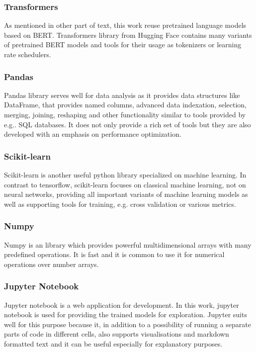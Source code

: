 \subsubsection{Transformers} 
As mentioned in other part of text, this work reuse pretrained language models based on BERT. Transformers library from Hugging Face\citep{Wolf2019HuggingFacesTS} contains many variants of pretrained BERT models and tools for their usage as tokenizers or learning rate schedulers.
\subsubsection{Pandas}
Pandas library \citep{reback2020pandas} serves well for data analysis as it provides data structures like DataFrame, that provides named columns, advanced data indexation, selection, merging, joining, reshaping and other functionality similar to tools provided by e.g.. SQL databases. It does not only provide a rich set of tools but they are also developed with an emphasis on performance optimization.
\subsubsection{Scikit-learn}
Scikit-learn \citep{scikit-learn}  is another useful python library specialized on machine learning. In contrast to tensorflow, scikit-learn focuses on classical machine learning, not on neural networks, providing all important variants of machine learning models as well as supporting tools for training, e.g. cross validation or various metrics.
\subsubsection{Numpy}
Numpy \citep{harris2020array} is an library which provides powerful multidimensional arrays with many predefined operations. It is fast and it is common to use it for numerical operations over number arrays.
\subsubsection{Jupyter Notebook}
Jupyter notebook \citep{jupyter} is a web application for development. In this work, jupyter notebook is used for providing the trained models for exploration. %
Jupyter suits well for this purpose because it, in addition to a possibility of running a separate parts of code in different cells, also supports visualisations and markdown formatted text and it can be useful especially for explanatory purposes.
